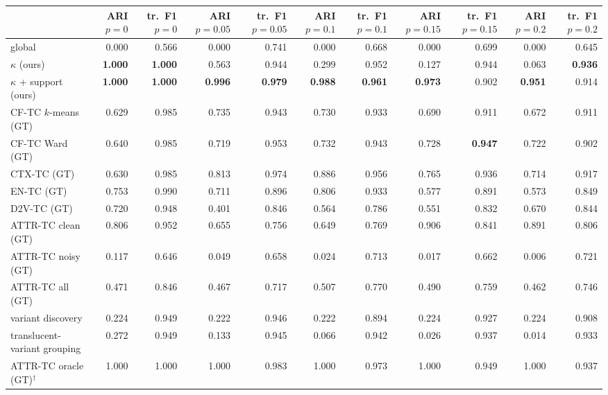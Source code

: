 \begin{tabular}{lrrrrrrrrrr}
\toprule
 & ARI $p{=}0$ & tr.\ F1 $p{=}0$ & ARI $p{=}0.05$ & tr.\ F1 $p{=}0.05$ & ARI $p{=}0.1$ & tr.\ F1 $p{=}0.1$ & ARI $p{=}0.15$ & tr.\ F1 $p{=}0.15$ & ARI $p{=}0.2$ & tr.\ F1 $p{=}0.2$ \\
\midrule
global & 0.000 & 0.566 & 0.000 & 0.741 & 0.000 & 0.668 & 0.000 & 0.699 & 0.000 & 0.645 \\
$\kappa$ (ours) & \textbf{1.000} & \textbf{1.000} & 0.563 & 0.944 & 0.299 & 0.952 & 0.127 & 0.944 & 0.063 & \textbf{0.936} \\
$\kappa$ + support (ours) & \textbf{1.000} & \textbf{1.000} & \textbf{0.996} & \textbf{0.979} & \textbf{0.988} & \textbf{0.961} & \textbf{0.973} & 0.902 & \textbf{0.951} & 0.914 \\
CF-TC $k$-means (GT) & 0.629 & 0.985 & 0.735 & 0.943 & 0.730 & 0.933 & 0.690 & 0.911 & 0.672 & 0.911 \\
CF-TC Ward (GT) & 0.640 & 0.985 & 0.719 & 0.953 & 0.732 & 0.943 & 0.728 & \textbf{0.947} & 0.722 & 0.902 \\
CTX-TC (GT) & 0.630 & 0.985 & 0.813 & 0.974 & 0.886 & 0.956 & 0.765 & 0.936 & 0.714 & 0.917 \\
EN-TC (GT) & 0.753 & 0.990 & 0.711 & 0.896 & 0.806 & 0.933 & 0.577 & 0.891 & 0.573 & 0.849 \\
D2V-TC (GT) & 0.720 & 0.948 & 0.401 & 0.846 & 0.564 & 0.786 & 0.551 & 0.832 & 0.670 & 0.844 \\
ATTR-TC clean (GT) & 0.806 & 0.952 & 0.655 & 0.756 & 0.649 & 0.769 & 0.906 & 0.841 & 0.891 & 0.806 \\
ATTR-TC noisy (GT) & 0.117 & 0.646 & 0.049 & 0.658 & 0.024 & 0.713 & 0.017 & 0.662 & 0.006 & 0.721 \\
ATTR-TC all (GT) & 0.471 & 0.846 & 0.467 & 0.717 & 0.507 & 0.770 & 0.490 & 0.759 & 0.462 & 0.746 \\
variant discovery & 0.224 & 0.949 & 0.222 & 0.946 & 0.222 & 0.894 & 0.224 & 0.927 & 0.224 & 0.908 \\
translucent-variant grouping & 0.272 & 0.949 & 0.133 & 0.945 & 0.066 & 0.942 & 0.026 & 0.937 & 0.014 & 0.933 \\
ATTR-TC oracle (GT)$^{\dagger}$ & 1.000 & 1.000 & 1.000 & 0.983 & 1.000 & 0.973 & 1.000 & 0.949 & 1.000 & 0.937 \\
\bottomrule
\end{tabular}
